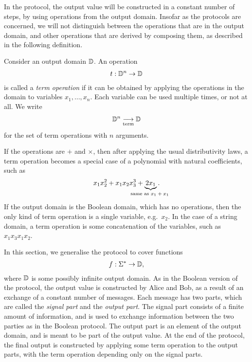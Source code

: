 In the protocol, the output value will be constructed in a constant number of steps, by using operations from the output domain. Insofar as the protocols are concerned, we will not distinguish between the  operations that are in the output domain, and other operations that are derived by composing them, as described in the following definition.

\begin{definition}\label{def:term-operations}
    Consider an output domain $\mathbb D$. An operation 
    \begin{align*}
    t : \mathbb D^n \to \mathbb D
    \end{align*}
    is called a \emph{term operation} if it can be obtained by applying the operations in the domain to variables $x_1,\ldots,x_n$. Each variable can be used multiple times, or not at all.  We write 
    \begin{align*}
    \mathbb D^n \underset{\text{term}}{\longrightarrow} \mathbb D
    \end{align*}
    for the set of term operations with $n$ arguments.
\end{definition}

\begin{myexample}
    If the operations are $+$ and $\times$, then after applying the usual distributivity laws,  a term operation becomes a special case of a polynomial with natural coefficients, such as 
\begin{align*}
x_1x_2^2 + x_1x_2x_3^3  + \myunderbrace{2x_1}{same as $x_1 + x_1$}.
\end{align*}
If the output domain is the Boolean domain, which has no operations, then the only kind of term operation is a single variable, e.g.~$x_2$.  In the case of a string domain, a term operation is some concatenation of the variables, such as $x_1 x_3 x_1 x_2$.
\end{myexample}



In this section, we generalise the protocol to cover functions 
\begin{align*}
f : \Sigma^* \to \mathbb D,
\end{align*}
where $\mathbb D$ is some possibly infinite output domain. As in the Boolean version of the protocol, the output value is constructed by Alice and Bob, as a result of an exchange of a constant number of messages. Each message has two parts, which are called the \emph{signal part} and the \emph{output part}. The signal part consists of a finite amount of information, and is used to exchange information between the two parties as in the Boolean protocol. The output part is an element of the output domain, and  is meant to be part of the output value. At the end of the protocol, the final output is constructed by applying some term operation to the output parts, with the term operation depending only on the signal parts. 

